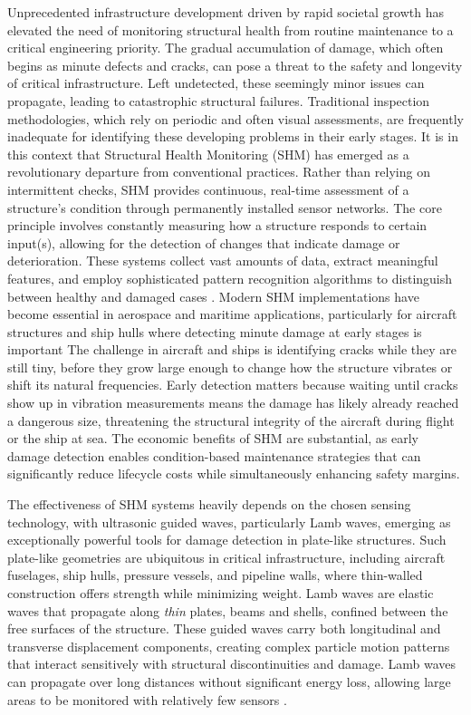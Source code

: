 \documentclass[12pt,a4paper]{report}
\begin{document}
Unprecedented infrastructure development driven by rapid societal growth has elevated the need of monitoring structural health from routine maintenance to a critical engineering priority. The gradual accumulation of damage, which often begins as minute defects and cracks, can pose a threat to the safety and longevity of critical infrastructure. Left undetected, these seemingly minor issues can propagate, leading to catastrophic structural failures. Traditional inspection methodologies, which rely on periodic and often visual assessments, are frequently inadequate for identifying these developing problems in their early stages. It is in this context that Structural Health Monitoring (SHM) has emerged as a revolutionary departure from conventional practices. Rather than relying on intermittent checks, SHM provides continuous, real-time assessment of a structure's condition through permanently installed sensor networks. The core principle involves constantly measuring how a structure responds to certain input(s), allowing for the detection of changes that indicate damage or deterioration. These systems collect vast amounts of data, extract meaningful features, and employ sophisticated pattern recognition algorithms to distinguish between healthy and damaged cases \citep{HUANG202248}. Modern SHM implementations have become essential in aerospace and maritime applications, particularly for aircraft structures and ship hulls where detecting minute damage at early stages is important \citep{Qing2019, silvacampillo2023health} The challenge in aircraft and ships is identifying cracks while they are still tiny, before they grow large enough to change how the structure vibrates or shift its natural frequencies. Early detection matters because waiting until cracks show up in vibration measurements means the damage has likely already reached a dangerous size, threatening the structural integrity of the aircraft during flight or the ship at sea\citep{Fan2021review}. The economic benefits of SHM are substantial, as early damage detection enables condition-based maintenance strategies that can significantly reduce lifecycle costs while simultaneously enhancing safety margins.


The effectiveness of SHM systems heavily depends on the chosen sensing technology, with ultrasonic guided waves, particularly Lamb waves, emerging as exceptionally powerful tools for damage detection in plate-like structures. Such plate-like geometries are ubiquitous in critical infrastructure, including aircraft fuselages, ship hulls, pressure vessels, and pipeline walls, where thin-walled construction offers strength while minimizing weight. Lamb waves are elastic waves that propagate along \textit{thin} plates, beams and shells, confined between the free surfaces of the structure. These guided waves carry both longitudinal and transverse displacement components, creating complex particle motion patterns that interact sensitively with structural discontinuities and damage. Lamb waves can propagate over long distances without significant energy loss, allowing large areas to be monitored with relatively few sensors  \citep{Philibert31122022, LU2024114666}.  
\end{document}

